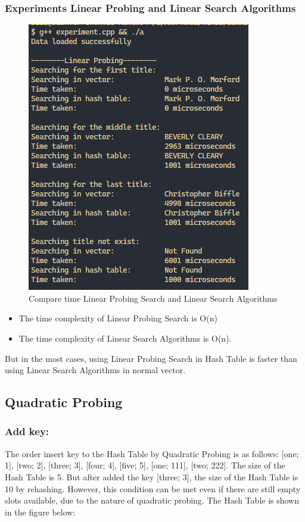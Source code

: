 \subsubsection{Experiments Linear Probing and Linear Search Algorithms}
\begin{figure}[H]
	\centering
	\includegraphics[width=0.7\linewidth]{img/Linear/Compare.PNG}
	\caption{Compare time Linear Probing Search and Linear Search Algorithms}
\end{figure}

\begin{itemize}
	\item The time complexity of Linear Probing Search is O(n)
	\item The time complexity of Linear Search Algorithms is O(n).
\end{itemize}
But in the most cases, using Linear Probing Search in Hash Table is faster than using Linear Search Algorithms in normal vector.

\pagebreak
\subsection{Quadratic Probing}


\subsubsection{Add key:}
The order insert key to the Hash Table by Quadratic Probing is as follows: [one; 1], [two; 2], [three; 3], [four; 4], [five; 5], [one; 111], [two; 222]. The size of the Hash Table is 5. But after added the key [three; 3], the size of the Hash Table is 10 by rehashing. However, this condition can be met even if there are still empty slots available, due to the nature of quadratic probing. The Hash Table is shown in the figure below:

